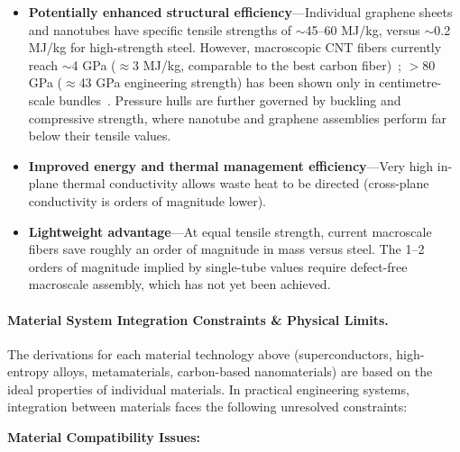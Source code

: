 \documentclass[aps,prd,twocolumn,superscriptaddress,nofootinbib]{revtex4-2}
\begin{document}
\begin{itemize}
  \item \textbf{Potentially enhanced structural efficiency}---Individual graphene sheets and nanotubes have specific tensile strengths of ${\sim}$45--60 MJ/kg, versus ${\sim}$0.2 MJ/kg for high-strength steel. However, macroscopic CNT fibers currently reach ${\sim}$4 GPa ($\approx$3 MJ/kg, comparable to the best carbon fiber)~\cite{Taylor2021}; $>$80 GPa ($\approx$43 GPa engineering strength) has been shown only in centimetre-scale bundles~\cite{Bai2018}. Pressure hulls are further governed by buckling and compressive strength, where nanotube and graphene assemblies perform far below their tensile values.
  \item \textbf{Improved energy and thermal management efficiency}---Very high in-plane thermal conductivity allows waste heat to be directed (cross-plane conductivity is orders of magnitude lower).
  \item \textbf{Lightweight advantage}---At equal tensile strength, current macroscale fibers save roughly an order of magnitude in mass versus steel. The 1--2 orders of magnitude implied by single-tube values require defect-free macroscale assembly, which has not yet been achieved.
\end{itemize}

\paragraph{Material System Integration Constraints \& Physical Limits.}\label{sec:material-limits}

The derivations for each material technology above (superconductors, high-entropy alloys, metamaterials, carbon-based nanomaterials) are based on the ideal properties of individual materials. In practical engineering systems, integration between materials faces the following unresolved constraints:

\textbf{Material Compatibility Issues:}
\end{document}
